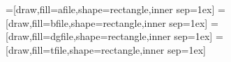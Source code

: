 
\usepackage{pgf,tikz}
\usetikzlibrary{babel}


=[draw,fill=afile,shape=rectangle,inner sep=1ex]
=[draw,fill=bfile,shape=rectangle,inner sep=1ex]
=[draw,fill=dgfile,shape=rectangle,inner sep=1ex]
=[draw,fill=tfile,shape=rectangle,inner sep=1ex]

\newcommand\arr[1][]{\draw[thick,->,#1]}
\def\afile{\node[style=afile]}
\def\bfile{\node[style=bfile]}
\def\dgfile{\node[style=dgfile]}
\def\tfile{\node[style=tfile]}

\newcommand{\filename}[1]{{\color{blue}{\textit{\begingroup \urlstyle{sf}\Url{#1}}}}}
\newcommand{\filenamew}[1]{{{\textit{\begingroup \urlstyle{sf}\Url{#1}}}}}
\newcommand{\command}[1]{\texttt{#1}}

